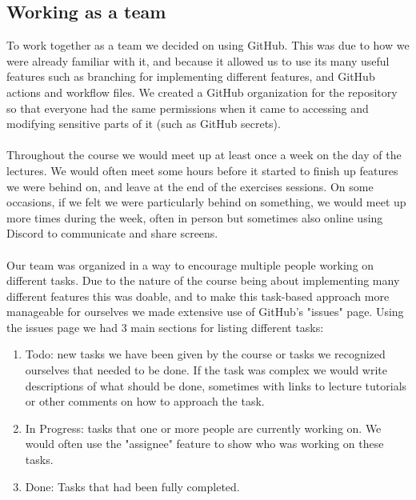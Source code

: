 \subsection*{Working as a team}

To work together as a team we decided on using GitHub. This was due to how we were already familiar with it, and because it allowed us to use its many useful features such as branching for implementing different features, and GitHub actions and workflow files. We created a GitHub organization for the repository so that everyone had the same permissions when it came to accessing and modifying sensitive parts of it (such as GitHub secrets).
\\\\
Throughout the course we would meet up at least once a week on the day of the lectures. We would often meet some hours before it started to finish up features we were behind on, and leave at the end of the exercises sessions. On some occasions, if we felt we were particularly behind on something, we would meet up more times during the week, often in person but sometimes also online using Discord to communicate and share screens.
\\\\
Our team was organized in a way to encourage multiple people working on different tasks. Due to the nature of the course being about implementing many different features this was doable, and to make this task-based approach more manageable for ourselves we made extensive use of GitHub's "issues" page. Using the issues page we had 3 main sections for listing different tasks:

\begin{enumerate}
    \item Todo: new tasks we have been given by the course or tasks we recognized ourselves that needed to be done. If the task was complex we would write descriptions of what should be done, sometimes with links to lecture tutorials or other comments on how to approach the task.
    \item In Progress: tasks that one or more people are currently working on. We would often use the "assignee" feature to show who was working on these tasks.
    \item Done: Tasks that had been fully completed.
\end{enumerate}

